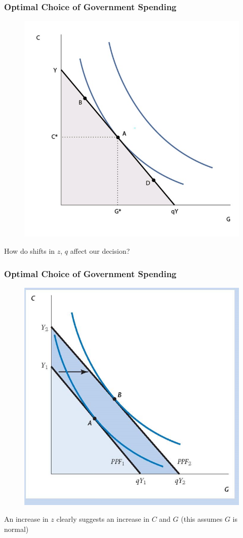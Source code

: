 \documentclass{beamer}
\begin{document}
\begin{frame}
\frametitle[alignment=center]{Optimal Choice of Government Spending}
\begin{figure}
\centering
\includegraphics[scale=0.5]{Figures/W_Fig_5pt19.png}
\end{figure}
How do shifts in $z$, $q$ affect our decision?
\end{frame}

\begin{frame}
\frametitle[alignment=center]{Optimal Choice of Government Spending}
\begin{figure}
\centering
\includegraphics[scale=0.5]{Figures/W_Fig_5pt20.png}
\end{figure}
An increase in $z$ clearly suggests an increase in $C$ and $G$ (this assumes $G$ is normal)
\end{frame}
\end{document}
